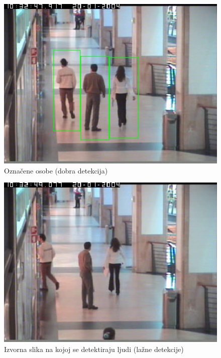 \documentclass[utf8, seminar, numeric, times]{fer}
\begin{document}
\begin{figure}
\centering
\includegraphics[width=1\textwidth]{dobra_detekt.png}
\caption{Označene osobe (dobra detekcija)}
\label{dobra_detekt}
\end{figure}


\begin{figure}
\centering
\includegraphics[width=1\textwidth]{lazna_original.png}
\caption{Izvorna slika na kojoj se detektiraju ljudi (lažne detekcije)}
\label{lazna_original}
\end{figure}
\end{document}
